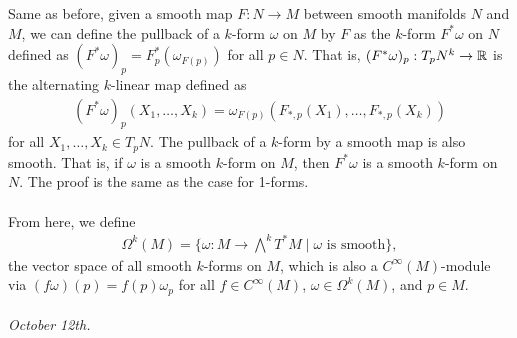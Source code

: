 Same as before, given a smooth map $F:N \to M$ between smooth manifolds $N$ and $M$, we can define the pullback of a $k$-form $\omega$ on $M$ by $F$ as the $k$-form $F^{\ast}\omega$ on $N$ defined as $(F^{\ast}\omega)_{p} = F^{\ast}_{p}(\omega_{F(p)})$ for all $p \in N$. That is, $(F^{\ast}\omega)_{p}:T_{p}N^{k} \to \mathbb{R}$ is the alternating $k$-linear map defined as
\begin{align}
    (F^{\ast}\omega)_{p}(X_{1},\ldots,X_{k}) = \omega_{F(p)}(F_{\ast,p}(X_{1}),\ldots,F_{\ast,p}(X_{k}))
\end{align}
for all $X_{1},\ldots,X_{k} \in T_{p}N$. The pullback of a $k$-form by a smooth map is also smooth. That is, if $\omega$ is a smooth $k$-form on $M$, then $F^{\ast}\omega$ is a smooth $k$-form on $N$. The proof is the same as the case for 1-forms.
\\ \\
From here, we define
\begin{align}
    \Omega^{k}(M) = \{\omega:M \to \bigwedge^{k}T^{\ast}M \mid \omega \text{ is smooth}\},
\end{align}
the vector space of all smooth $k$-forms on $M$, which is also a $C^{\infty}(M)$-module via $(f\omega)(p) = f(p)\omega_{p}$ for all $f \in C^{\infty}(M)$, $\omega \in \Omega^{k}(M)$, and $p \in M$.
\\ \\
\textit{October 12th.}

